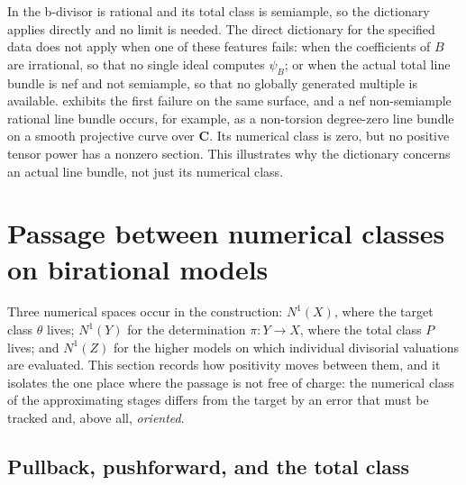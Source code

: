 \begin{remark}
\label{rem:ch38-example-limits}
In  the b-divisor is rational and
its total class is semiample, so the dictionary
 applies directly and no limit is
needed. The direct dictionary for the specified data does not apply
when one of these features fails: when the coefficients of $B$ are
irrational, so that no single ideal computes $\psi_B$; or when the actual total
line bundle is nef and not semiample, so that no globally
generated multiple is available.
 exhibits the first failure on the same
surface, and a nef non-semiample rational line bundle occurs, for example, as
a non-torsion degree-zero line bundle on a smooth projective curve
over $\mathbf C$. Its numerical class is zero, but no positive
tensor power has a nonzero section. This illustrates why the
dictionary concerns an actual line bundle, not just its numerical class.
\end{remark}

\section{Passage between numerical classes on birational models}
\label{sec:ch38-classes}

Three numerical spaces occur in the construction: $N^1(X)$, where the
target class $\theta$ lives; $N^1(Y)$ for the determination
$\pi:Y\to X$, where the total class $P$ lives; and $N^1(Z)$ for the
higher models on which individual divisorial valuations are evaluated.
This section records how positivity moves between them, and it isolates the
one place where the passage is not free of charge: the numerical class of
the approximating stages differs from the target by an error that must be
tracked and, above all, \emph{oriented}.

\subsection{Pullback, pushforward, and the total class}
\label{sec:ch38-pullback-pushforward}

